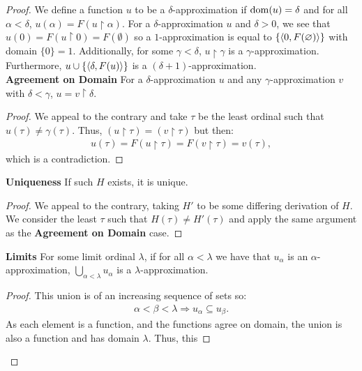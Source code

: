 \begin{proof}
    We define a function $u$ to be a $\delta$-approximation if 
    $\operatorname{dom}(u) = \delta$ and for all $\alpha < \delta$, 
    $u(\alpha) = F(u \upharpoonright \alpha)$. 
    For a $\delta$-approximation $u$ and $\delta > 0$, we see that 
    $u(0) = F(u \upharpoonright 0) = F(\emptyset)$ so a $1$-approximation is 
    equal to $\{{\langle 0, F(\varnothing) \rangle}\}$ with domain $\{0\} = 1$. Additionally, 
    for some $\gamma < \delta$, $u \upharpoonright \gamma$ is a $\gamma$-approximation.
    Furthermore, $u \cup \{{\langle \delta, F(u) \rangle}\}$ is a 
    $(\delta + 1)$-approximation.
    \\[\baselineskip]
    \textbf{Agreement on Domain}
    For a $\delta$-approximation $u$ and any $\gamma$-approximation $v$
    with $\delta < \gamma$, $u = v \upharpoonright \delta$.
    \begin{proof}
        We appeal to the contrary and take $\tau$ be the least ordinal such that
        \linebreak $u(\tau) \neq \gamma(\tau)$. Thus, $(u \upharpoonright \tau)
        = (v \upharpoonright \tau)$ but then: \begin{align*}
            u(\tau) 
            = F(u \upharpoonright \tau)
            = F(v \upharpoonright \tau)
            = v(\tau),
        \end{align*} which is a contradiction.
    \end{proof}
    \noindent
    \textbf{Uniqueness}
    If such $H$ exists, it is unique.
    \begin{proof}
        We appeal to the contrary, taking $H'$ to be some differing
        derivation of $H$. We consider the least $\tau$ such that
        $H(\tau) \neq H'(\tau)$ and apply the same argument as
        the \textbf{Agreement on Domain} case.
    \end{proof}
    \noindent
    \textbf{Limits}
    For some limit ordinal $\lambda$, if for all $\alpha < \lambda$
    we have that $u_\alpha$ is an $\alpha$-approximation, 
    $\bigcup_{\alpha < \lambda} u_\alpha$ is a $\lambda$-approximation.
    \begin{proof}
        This union is of an increasing sequence of sets so:
        \begin{align*}
            \alpha < \beta < \lambda \Longrightarrow u_\alpha \subseteq u_\beta.
        \end{align*}
        As each element is a function, and the functions agree on domain,
        the union is also a function and has domain $\lambda$. Thus, this 

\end{proof}
\end{proof}
